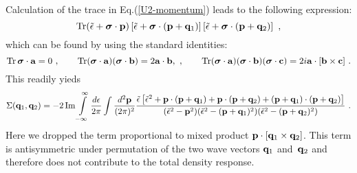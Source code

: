 \documentclass[preprint,aps,prb]{revtex4}
\begin{document}
Calculation of the trace in Eq.(\ref{U2-momentum}) leads to the 
following expression: 
\begin{equation}
\mathop{\rm Tr}\nolimits (\tilde\epsilon + {\bm \sigma} \cdot {\bf p})
 \left[\tilde\epsilon + {\bm \sigma} \cdot ({\bf p} + {\bf q}_1) \right]
 \left[\tilde\epsilon + {\bm \sigma} \cdot ({\bf p} + {\bf q}_2) \right]
 \ , 
\end{equation}
which can be found by using the standard identities:
\begin{equation}
\mathop{\rm Tr}\nolimits {\bm \sigma} \cdot {\bf a} = 0
\ , \qquad \mathop{\rm Tr}\nolimits ({\bm \sigma} \cdot {\bf a} )
({\bm \sigma} \cdot {\bf b} ) = 2 {\bf a} \cdot {\bf b}, 
\ , \qquad \mathop{\rm Tr}\nolimits ({\bm \sigma} \cdot {\bf a} )
({\bm \sigma} \cdot {\bf b} ) ({\bm \sigma} \cdot {\bf c} ) = 
2 i {\bf a} \cdot [{\bf b} \times {\bf c}]
\ .
\end{equation}
This readily yieds
\begin{equation}
\label{U2-trace}
\Sigma({\bf q}_1, {\bf q}_2) 
= -2 \mathop{\rm Im}\nolimits \int\limits_{-\infty}^{\infty}
\frac{d\epsilon}{2\pi}
\int\frac{d^2{\bf p}}{(2\pi)^2} 
\frac{
  \tilde{\epsilon}
  \left[\tilde{\epsilon}^2 
     + {\bf p}\cdot({\bf p} + {\bf q}_1) 
     + {\bf p}\cdot({\bf p} + {\bf q}_2) 
     + ({\bf p} + {\bf q}_1)\cdot({\bf p} +  {\bf q}_2)
  \right] 
}{
   (\tilde{\epsilon}^2 - {\bf p}^2) 
   (\tilde{\epsilon}^2 - ({\bf p} + {\bf q}_1)^2)
   (\tilde{\epsilon}^2 - ({\bf p} + {\bf q}_2)^2)
}
\ .
\end{equation}
Here we dropped the term proportional to mixed product
${\bf p} \cdot [{\bf q}_1 \times {\bf q}_2]$. This term 
is antisymmetric under permutation of the two wave vectors
${\bf q}_1$ and~${\bf q}_2$ and therefore does not contribute
to the total density response. 
\end{document}
